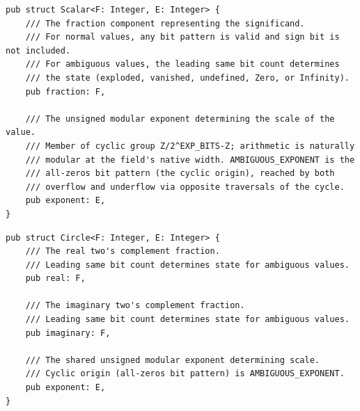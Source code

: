 \documentclass[12pt,letter]{article}
\begin{document}
\newpage

\begin{lstlisting}[style=rust, caption={Scalar Type Definition in Rust}, label={fig:scalar_structure}]
pub struct Scalar<F: Integer, E: Integer> {
	/// The fraction component representing the significand.
	/// For normal values, any bit pattern is valid and sign bit is not included.
	/// For ambiguous values, the leading same bit count determines
	/// the state (exploded, vanished, undefined, Zero, or Infinity).
	pub fraction: F,

	/// The unsigned modular exponent determining the scale of the value.
	/// Member of cyclic group Z/2^EXP_BITS-Z; arithmetic is naturally
	/// modular at the field's native width. AMBIGUOUS_EXPONENT is the
	/// all-zeros bit pattern (the cyclic origin), reached by both
	/// overflow and underflow via opposite traversals of the cycle.
	pub exponent: E,
}
\end{lstlisting}

\begin{lstlisting}[style=rust, caption={Circle Type Definition in Rust}, label={fig:circle_structure}]
pub struct Circle<F: Integer, E: Integer> {
	/// The real two's complement fraction.
	/// Leading same bit count determines state for ambiguous values.
	pub real: F,

	/// The imaginary two's complement fraction.
	/// Leading same bit count determines state for ambiguous values.
	pub imaginary: F,

	/// The shared unsigned modular exponent determining scale.
	/// Cyclic origin (all-zeros bit pattern) is AMBIGUOUS_EXPONENT.
	pub exponent: E,
}
\end{lstlisting}
\end{document}
